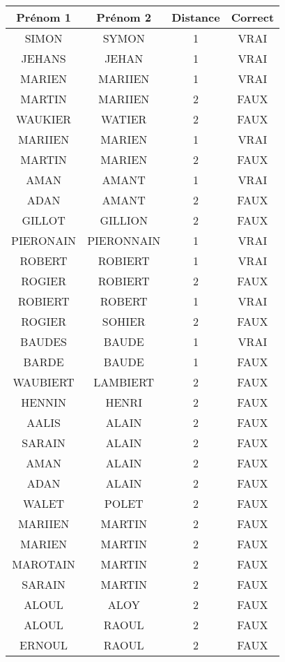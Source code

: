 \small
\begin{center}
\begin{longtable}{|c|c|c|c|}
\hline	Prénom 1	&	Prénom 2	&	Distance	&	Correct\\
\hline
\hline	SIMON	&	SYMON	&	1	&	VRAI	\\
\hline	JEHANS	&	JEHAN	&	1	&	VRAI	\\
\hline	MARIEN	&	MARIIEN	&	1	&	VRAI	\\
\hline	MARTIN	&	MARIIEN	&	2	&	FAUX	\\
\hline	WAUKIER	&	WATIER	&	2	&	FAUX	\\
\hline	MARIIEN	&	MARIEN	&	1	&	VRAI	\\
\hline	MARTIN	&	MARIEN	&	2	&	FAUX	\\
\hline	AMAN	&	AMANT	&	1	&	VRAI	\\
\hline	ADAN	&	AMANT	&	2	&	FAUX	\\
\hline	GILLOT	&	GILLION	&	2	&	FAUX	\\
\hline	PIERONAIN	&	PIERONNAIN	&	1	&	VRAI	\\
\hline	ROBERT	&	ROBIERT	&	1	&	VRAI	\\
\hline	ROGIER	&	ROBIERT	&	2	&	FAUX	\\
\hline	ROBIERT	&	ROBERT	&	1	&	VRAI	\\
\hline	ROGIER	&	SOHIER	&	2	&	FAUX	\\
\hline	BAUDES	&	BAUDE	&	1	&	VRAI	\\
\hline	BARDE	&	BAUDE	&	1	&	FAUX	\\
\hline	WAUBIERT	&	LAMBIERT	&	2	&	FAUX	\\
\hline	HENNIN	&	HENRI	&	2	&	FAUX	\\
\hline	AALIS	&	ALAIN	&	2	&	FAUX	\\
\hline	SARAIN	&	ALAIN	&	2	&	FAUX	\\
\hline	AMAN	&	ALAIN	&	2	&	FAUX	\\
\hline	ADAN	&	ALAIN	&	2	&	FAUX	\\
\hline	WALET	&	POLET	&	2	&	FAUX	\\
\hline	MARIIEN	&	MARTIN	&	2	&	FAUX	\\
\hline	MARIEN	&	MARTIN	&	2	&	FAUX	\\
\hline	MAROTAIN	&	MARTIN	&	2	&	FAUX	\\
\hline	SARAIN	&	MARTIN	&	2	&	FAUX	\\
\hline	ALOUL	&	ALOY	&	2	&	FAUX	\\
\hline	ALOUL	&	RAOUL	&	2	&	FAUX	\\
\hline	ERNOUL	&	RAOUL	&	2	&	FAUX	\\

\end{longtable}
\end{center}
